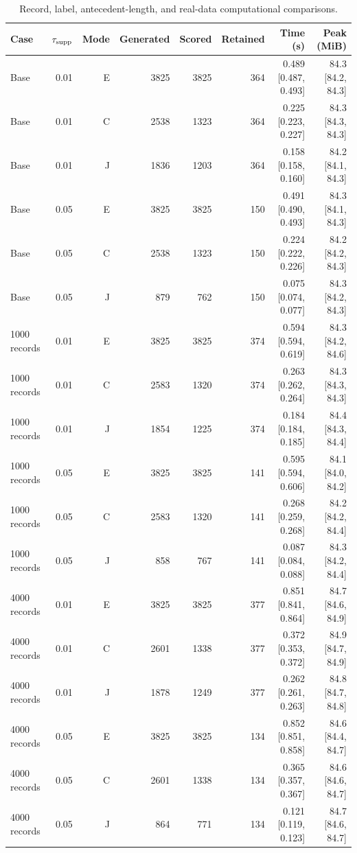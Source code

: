 \begin{table}[t]
\centering\color{red}
\caption{Record, label, antecedent-length, and real-data computational comparisons.}
\label{tab:computational-axes}
\begin{tabular}{lrrrrrrr}
\toprule
Case & $\tau_{\rm supp}$ & Mode & Generated & Scored & Retained & Time (s) & Peak (MiB) \\
\midrule
Base & 0.01 & E & 3825 & 3825 & 364 & 0.489 [0.487, 0.493] & 84.3 [84.2, 84.3] \\
Base & 0.01 & C & 2538 & 1323 & 364 & 0.225 [0.223, 0.227] & 84.3 [84.3, 84.3] \\
Base & 0.01 & J & 1836 & 1203 & 364 & 0.158 [0.158, 0.160] & 84.2 [84.1, 84.3] \\
Base & 0.05 & E & 3825 & 3825 & 150 & 0.491 [0.490, 0.493] & 84.3 [84.1, 84.3] \\
Base & 0.05 & C & 2538 & 1323 & 150 & 0.224 [0.222, 0.226] & 84.2 [84.2, 84.3] \\
Base & 0.05 & J & 879 & 762 & 150 & 0.075 [0.074, 0.077] & 84.3 [84.2, 84.3] \\
1000 records & 0.01 & E & 3825 & 3825 & 374 & 0.594 [0.594, 0.619] & 84.3 [84.2, 84.6] \\
1000 records & 0.01 & C & 2583 & 1320 & 374 & 0.263 [0.262, 0.264] & 84.3 [84.3, 84.3] \\
1000 records & 0.01 & J & 1854 & 1225 & 374 & 0.184 [0.184, 0.185] & 84.4 [84.3, 84.4] \\
1000 records & 0.05 & E & 3825 & 3825 & 141 & 0.595 [0.594, 0.606] & 84.1 [84.0, 84.2] \\
1000 records & 0.05 & C & 2583 & 1320 & 141 & 0.268 [0.259, 0.268] & 84.2 [84.2, 84.4] \\
1000 records & 0.05 & J & 858 & 767 & 141 & 0.087 [0.084, 0.088] & 84.3 [84.2, 84.4] \\
4000 records & 0.01 & E & 3825 & 3825 & 377 & 0.851 [0.841, 0.864] & 84.7 [84.6, 84.9] \\
4000 records & 0.01 & C & 2601 & 1338 & 377 & 0.372 [0.353, 0.372] & 84.9 [84.7, 84.9] \\
4000 records & 0.01 & J & 1878 & 1249 & 377 & 0.262 [0.261, 0.263] & 84.8 [84.7, 84.8] \\
4000 records & 0.05 & E & 3825 & 3825 & 134 & 0.852 [0.851, 0.858] & 84.6 [84.4, 84.7] \\
4000 records & 0.05 & C & 2601 & 1338 & 134 & 0.365 [0.357, 0.367] & 84.6 [84.6, 84.7] \\
4000 records & 0.05 & J & 864 & 771 & 134 & 0.121 [0.119, 0.123] & 84.7 [84.6, 84.7] \\

\end{tabular}
\end{table}
